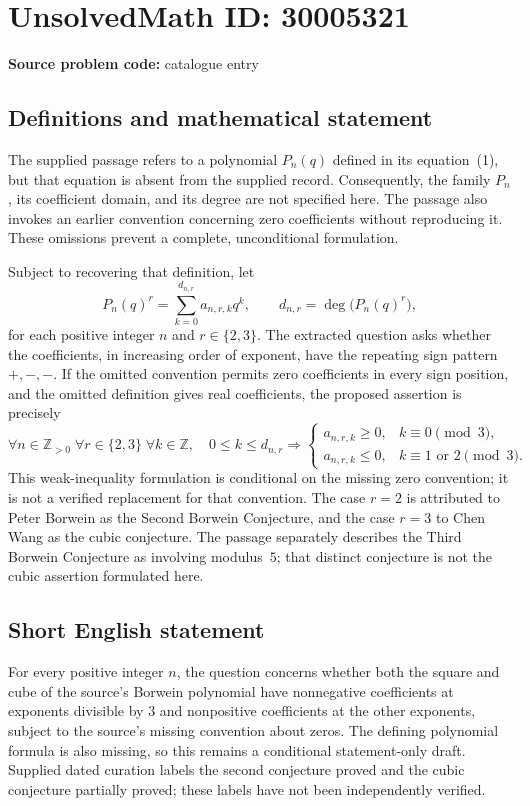 \documentclass[11pt]{article}
\newcommand{\Z}{\mathbb{Z}}
\begin{document}
\section*{UnsolvedMath ID: 30005321}
\textbf{Source problem code:} catalogue entry
\subsection{Definitions and mathematical statement}
The supplied passage refers to a polynomial \(P_n(q)\) defined in its equation~(1), but that equation is absent from the supplied record. Consequently, the family \(P_n\), its coefficient domain, and its degree are not specified here. The passage also invokes an earlier convention concerning zero coefficients without reproducing it. These omissions prevent a complete, unconditional formulation.

Subject to recovering that definition, let
\[
P_n(q)^r=\sum_{k=0}^{d_{n,r}}a_{n,r,k}q^k,
\qquad d_{n,r}=\deg\bigl(P_n(q)^r\bigr),
\]
for each positive integer \(n\) and \(r\in\{2,3\}\). The extracted question asks whether the coefficients, in increasing order of exponent, have the repeating sign pattern \(+,-,-\). If the omitted convention permits zero coefficients in every sign position, and the omitted definition gives real coefficients, the proposed assertion is precisely
\[
\forall n\in\Z_{>0}\;\forall r\in\{2,3\}\;\forall k\in\Z,
\quad 0\le k\le d_{n,r}\Longrightarrow
\begin{cases}
a_{n,r,k}\ge0,&k\equiv0\pmod3,\\
a_{n,r,k}\le0,&k\equiv1\text{ or }2\pmod3.
\end{cases}
\]
This weak-inequality formulation is conditional on the missing zero convention; it is not a verified replacement for that convention. The case \(r=2\) is attributed to Peter Borwein as the Second Borwein Conjecture, and the case \(r=3\) to Chen Wang as the cubic conjecture. The passage separately describes the Third Borwein Conjecture as involving modulus~\(5\); that distinct conjecture is not the cubic assertion formulated here.
\subsection{Short English statement}
For every positive integer \(n\), the question concerns whether both the square and cube of the source's Borwein polynomial have nonnegative coefficients at exponents divisible by \(3\) and nonpositive coefficients at the other exponents, subject to the source's missing convention about zeros. The defining polynomial formula is also missing, so this remains a conditional statement-only draft. Supplied dated curation labels the second conjecture proved and the cubic conjecture partially proved; these labels have not been independently verified.
\end{document}
